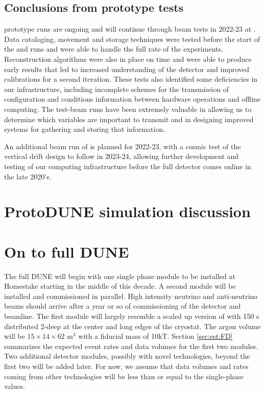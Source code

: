 \documentclass[../main-v1.tex]{subfiles}
\begin{document}
\subsection{Conclusions from prototype tests }
 prototype runs are ongoing and will continue through beam tests in 2022-23 at .  Data cataloging, movement and storage techniques were tested before the start of the  and   runs and were able to handle the full rate of the experiments.   Reconstruction algorithms were also in place on time and were able to produce early results that led to increased understanding of the detector and improved calibrations for a second iteration.  These tests also identified some deficiencies in our infrastructure, including incomplete schemes for the transmission of configuration and conditions information between hardware operations and  offline computing.  The test-beam runs have been extremely valuable in allowing us to determine which variables are important to transmit and in designing improved systems for gathering and storing that information. 

An additional beam run of   is planned for 2022-23, with a cosmic test of the vertical drift design to follow in 2023-24, allowing further development and testing of our computing infrastructure before the full detector comes online in the late 2020's. 

\section{ProtoDUNE simulation discussion }

\section{On to full DUNE }\label{sec:intro-fd}

The full DUNE  will begin with one single phase  module to be installed at Homestake starting in the middle of  this decade.  A second  module will be installed and commissioned in parallel.  High intensity neutrino and anti-neutrino beams should arrive after a year or so of commissioning of the detector and  beamline.  The first  module will largely resemble a scaled up version of  with 150 s distributed 2-deep at the center and long edges of the cryostat.   The argon volume will be $15\times14\times62$ m$^3$ with a fiducial mass of 10kT.  Section \ref{sec:est:FD} summarizes the expected event rates and data volumes for the first two modules.  Two additional detector modules, possibly with novel technologies, beyond the first two will be added later. For now, we assume that data volumes and rates coming from other technologies will be less than or equal to the single-phase values. 
\end{document}
